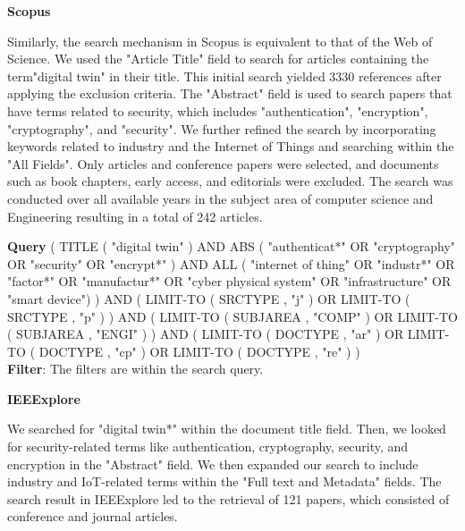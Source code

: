 
\textbf{Scopus}

Similarly, the search mechanism in Scopus is equivalent to that of the Web of Science. We used the "Article Title" field to search for articles containing the term"digital twin" in their title. This initial search yielded 3330 references after applying the exclusion criteria. The "Abstract" field is used to search papers that have terms related to security, which includes  "authentication", "encryption", "cryptography", and "security". We further refined the search by incorporating keywords related to industry and the Internet of Things and searching within the "All Fields". Only articles and conference papers were selected, and documents such as book chapters, early access, and editorials were excluded. The search was conducted over all available years in the subject area of computer science and Engineering resulting in a total of 242 articles.

\begin{tcolorbox}[colback=black!5!white, sharp corners=all, colframe=white!95!black]
\textbf{Query}
\tcblower
( TITLE ( "digital twin" )  AND  ABS ( "authenticat*"  OR  "cryptography"  OR  "security"  OR  "encrypt*" )  AND  ALL ( "internet of thing" OR "industr*"  OR  "factor*"  OR  "manufactur*"  OR  "cyber physical system"  OR  "infrastructure" OR "smart device") )  AND  ( LIMIT-TO ( SRCTYPE ,  "j" )  OR  LIMIT-TO ( SRCTYPE ,  "p" ) )  AND  ( LIMIT-TO ( SUBJAREA ,  "COMP" )  OR  LIMIT-TO ( SUBJAREA ,  "ENGI" ) )  AND  ( LIMIT-TO ( DOCTYPE ,  "ar" )  OR  LIMIT-TO ( DOCTYPE ,  "cp" )  OR  LIMIT-TO ( DOCTYPE ,  "re" ) )\\

\textbf{Filter}: The filters are within the search query.
\end{tcolorbox}


\textbf{IEEExplore}

We searched for "digital twin*" within the document title field. Then, we looked for security-related terms like authentication, cryptography, security, and encryption in the "Abstract" field. We then expanded our search to include industry and IoT-related terms within the "Full text and Metadata" fields. The search result in IEEExplore led to the retrieval of 121 papers, which consisted of conference and journal articles.

